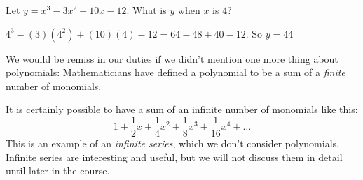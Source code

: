 \begin{Exercise}[title={Evaluate a Polynomial}, label=evaluatepolynomial]
  Let $y = x^3 - 3x^2 + 10x - 12$. What is $y$ when $x$ is $4$?
\end{Exercise}
\begin{Answer}[ref=evaluatepolynomial]
  $4^3 - (3)(4^2) + (10)(4) - 12 = 64 - 48 + 40 - 12$. So $y = 44$ 
\end{Answer}

We wouild be remiss in our duties if we didn't mention one more thing
about polynomials: Mathematicians have defined a polynomial to be a sum
of a \emph{finite} number of monomials.

It is certainly possible to have a sum of an infinite number of monomials
like this:
\begin{equation*}
1 + \frac{1}{2}x + \frac{1}{4}x^2 + \frac{1}{8}x^3 + \frac{1}{16}x^4 + \ldots
\end{equation*}
This is an example of an \emph{infinite series}, which we don't consider
polynomials. Infinite series are interesting and useful, but we 
will not discuss them in detail until later in the course.
